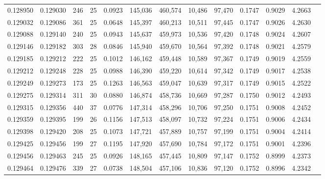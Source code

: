 \begin{tabular}{rrrrrrrrrrrrr}
0.128950 & 0.129030 &   246 &  25 &                                     0.0923 & 145,036 & 460,574 &  10,486 &  97,470 & 0.1747 & 0.9029 & 4.2663 \\
0.129032 & 0.129086 &   361 &  25 &                                     0.0648 & 145,397 & 460,213 &  10,511 &  97,445 & 0.1747 & 0.9026 & 4.2630 \\
0.129088 & 0.129140 &   240 &  25 &                                     0.0943 & 145,637 & 459,973 &  10,536 &  97,420 & 0.1748 & 0.9024 & 4.2607 \\
0.129146 & 0.129182 &   303 &  28 &                                     0.0846 & 145,940 & 459,670 &  10,564 &  97,392 & 0.1748 & 0.9021 & 4.2579 \\
0.129185 & 0.129212 &   222 &  25 &                                     0.1012 & 146,162 & 459,448 &  10,589 &  97,367 & 0.1749 & 0.9019 & 4.2559 \\
0.129212 & 0.129248 &   228 &  25 &                                     0.0988 & 146,390 & 459,220 &  10,614 &  97,342 & 0.1749 & 0.9017 & 4.2538 \\
0.129249 & 0.129273 &   173 &  25 &                                     0.1263 & 146,563 & 459,047 &  10,639 &  97,317 & 0.1749 & 0.9015 & 4.2522 \\
0.129275 & 0.129314 &   311 &  30 &                                     0.0880 & 146,874 & 458,736 &  10,669 &  97,287 & 0.1750 & 0.9012 & 4.2493 \\
0.129315 & 0.129356 &   440 &  37 &                                     0.0776 & 147,314 & 458,296 &  10,706 &  97,250 & 0.1751 & 0.9008 & 4.2452 \\
0.129359 & 0.129395 &   199 &  26 &                                     0.1156 & 147,513 & 458,097 &  10,732 &  97,224 & 0.1751 & 0.9006 & 4.2434 \\
0.129398 & 0.129420 &   208 &  25 &                                     0.1073 & 147,721 & 457,889 &  10,757 &  97,199 & 0.1751 & 0.9004 & 4.2414 \\
0.129425 & 0.129456 &   199 &  27 &                                     0.1195 & 147,920 & 457,690 &  10,784 &  97,172 & 0.1751 & 0.9001 & 4.2396 \\
0.129456 & 0.129463 &   245 &  25 &                                     0.0926 & 148,165 & 457,445 &  10,809 &  97,147 & 0.1752 & 0.8999 & 4.2373 \\
0.129464 & 0.129476 &   339 &  27 &                                     0.0738 & 148,504 & 457,106 &  10,836 &  97,120 & 0.1752 & 0.8996 & 4.2342 \\

\end{tabular}
